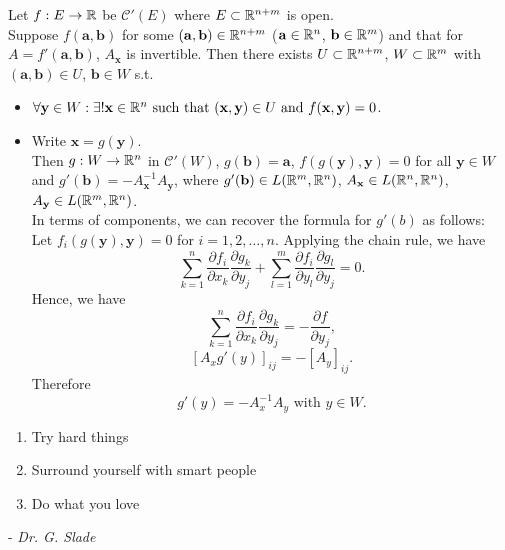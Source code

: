 \begin{thm}
	Let $f: E\to \mathbb{R}$ be $\mathcal{C}'(E)$ where $E \subset \mathbb{R}^{n+m}$ is open.\\
	Suppose $f(\mathbf{a},\mathbf{b})$ for some $(\mathbf{a},\mathbf{b}) \in \mathbb{R}^{n+m}$ ($\mathbf{a} \in \mathbb{R}^{n}$, $\mathbf{b} \in \mathbb{R}^{m}$) and that for $A=f'(\mathbf{a},\mathbf{b})$, $A_{\mathbf{x}}$ is invertible.
	Then there exists $U \subset \mathbb{R}^{n+m}$, $W \subset \mathbb{R}^{m}$ with $(\mathbf{a},\mathbf{b}) \in U$, $\mathbf{b} \in W$ s.t.
	\begin{itemize}
		\item $\forall{\mathbf{y} \in W}: \exists!{\mathbf{x} \in \mathbb{R}^{n}} \text{ such that } (\mathbf{x},\mathbf{y}) \in U \text{ and } f(\mathbf{x},\mathbf{y})=0$.
		\item Write $\mathbf{x}=g(\mathbf{y})$.\\
		      Then $g: W\to \mathbb{R}^{n}$ in $\mathcal{C}'(W)$, $g(\mathbf{b})=\mathbf{a}$, $f(g(\mathbf{y}),\mathbf{y})=0$ for all $\mathbf{y} \in W$ and $g'(\mathbf{b})=-A^{-1}_{\mathbf{x}} A_{\mathbf{y}}$, where $g'(\mathbf{b}) \in L(\mathbb{R}^{m},\mathbb{R}^{n})$, $A_{\mathbf{x}} \in L(\mathbb{R}^{n},\mathbb{R}^{n})$, $A_{\mathbf{y}} \in L(\mathbb{R}^{m},\mathbb{R}^{n})$.\\
		      In terms of components, we can recover the formula for $g'(b)$ as follows:\\
		      Let $f_i(g(\mathbf{y}),\mathbf{y})=0$ for $i=1,2,\ldots,n$.
		      Applying the chain rule, we have
		      \[
			      \sum_{k=1}^{n}{\frac{\partial f_i}{\partial x_k}\frac{\partial g_k}{\partial y_j}}+
			      \sum_{l=1}^{m}{\frac{\partial f_i}{\partial y_l}\frac{\partial g_l}{\partial y_j}}=0
			      .\]
		      Hence, we have
		      \[
			      \sum_{k=1}^{n}{\frac{\partial{f_i}}{\partial{x_k}} \frac{\partial{g_k}}{\partial{y_j}}}=- \frac{\partial{f}}{\partial{y_j}}
			      ,\]
		      \[
			      \left[A_x g'(y)\right]_{ij}= - \left[A_y\right]_{ij}
			      .\]
		      Therefore \[
			      g'(y)=-A_x^{-1}A_y \text{ with } y \in W
			      .\]
	\end{itemize}
\end{thm}





\begin{remark}
	\begin{enumerate}
		\item Try hard things
		\item Surround yourself with smart people
		\item Do what you love
	\end{enumerate}
	- \textit{Dr. G. Slade}
\end{remark}

